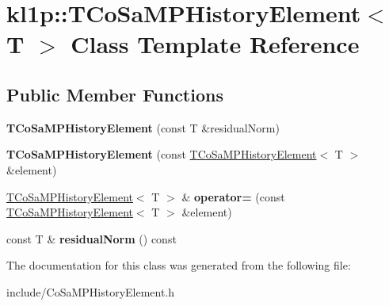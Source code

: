 \hypertarget{classkl1p_1_1TCoSaMPHistoryElement}{}\section{kl1p\+:\+:T\+Co\+Sa\+M\+P\+History\+Element$<$ T $>$ Class Template Reference}
\label{classkl1p_1_1TCoSaMPHistoryElement}
\subsection*{Public Member Functions}
\begin{DoxyCompactItemize}
\item 
{\bfseries T\+Co\+Sa\+M\+P\+History\+Element} (const T \&residual\+Norm)\hypertarget{classkl1p_1_1TCoSaMPHistoryElement_a82366484f6c6a943213bfe878da748f3}{}\label{classkl1p_1_1TCoSaMPHistoryElement_a82366484f6c6a943213bfe878da748f3}

\item 
{\bfseries T\+Co\+Sa\+M\+P\+History\+Element} (const \hyperlink{classkl1p_1_1TCoSaMPHistoryElement}{T\+Co\+Sa\+M\+P\+History\+Element}$<$ T $>$ \&element)\hypertarget{classkl1p_1_1TCoSaMPHistoryElement_a7029a151ac5097f65f756a86eed54929}{}\label{classkl1p_1_1TCoSaMPHistoryElement_a7029a151ac5097f65f756a86eed54929}

\item 
\hyperlink{classkl1p_1_1TCoSaMPHistoryElement}{T\+Co\+Sa\+M\+P\+History\+Element}$<$ T $>$ \& {\bfseries operator=} (const \hyperlink{classkl1p_1_1TCoSaMPHistoryElement}{T\+Co\+Sa\+M\+P\+History\+Element}$<$ T $>$ \&element)\hypertarget{classkl1p_1_1TCoSaMPHistoryElement_a305a8fd870b2542304f00170c56229fc}{}\label{classkl1p_1_1TCoSaMPHistoryElement_a305a8fd870b2542304f00170c56229fc}

\item 
const T \& {\bfseries residual\+Norm} () const \hypertarget{classkl1p_1_1TCoSaMPHistoryElement_ab8f779cc6a8a76401db476d849b49a61}{}\label{classkl1p_1_1TCoSaMPHistoryElement_ab8f779cc6a8a76401db476d849b49a61}

\end{DoxyCompactItemize}


The documentation for this class was generated from the following file\+:\begin{DoxyCompactItemize}
\item 
include/Co\+Sa\+M\+P\+History\+Element.\+h\end{DoxyCompactItemize}
